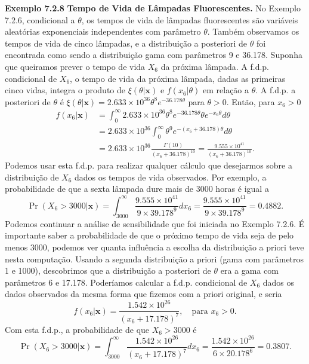 \vspace{1cm}
\noindent\textbf{Exemplo 7.2.8} \quad \textbf{Tempo de Vida de Lâmpadas Fluorescentes.} No Exemplo 7.2.6, condicional a $\theta$, os tempos de vida de lâmpadas fluorescentes são variáveis aleatórias exponenciais independentes com parâmetro $\theta$. Também observamos os tempos de vida de cinco lâmpadas, e a distribuição a posteriori de $\theta$ foi encontrada como sendo a distribuição gama com parâmetros 9 e 36.178. Suponha que queiramos prever o tempo de vida $X_6$ da próxima lâmpada.
A f.d.p. condicional de $X_6$, o tempo de vida da próxima lâmpada, dadas as primeiras cinco vidas, integra o produto de $\xi(\theta|\mathbf{x})$ e $f(x_6|\theta)$ em relação a $\theta$. A f.d.p. a posteriori de $\theta$ é $\xi(\theta|\mathbf{x}) = 2.633 \times 10^{36} \theta^8 e^{-36.178\theta}$ para $\theta > 0$. Então, para $x_6 > 0$
\begin{align}
f(x_6|\mathbf{x}) &= \int_0^{\infty} 2.633 \times 10^{36} \theta^8 e^{-36.178\theta} \theta e^{-x_6\theta} d\theta \nonumber \\
&= 2.633 \times 10^{36} \int_0^{\infty} \theta^9 e^{-(x_6+36.178)\theta} d\theta \tag{7.2.18} \\
&= 2.633 \times 10^{36} \frac{\Gamma(10)}{(x_6+36.178)^{10}} = \frac{9.555 \times 10^{41}}{(x_6+36.178)^{10}}. \nonumber
\end{align}
Podemos usar esta f.d.p. para realizar qualquer cálculo que desejarmos sobre a distribuição de $X_6$ dados os tempos de vida observados. Por exemplo, a probabilidade de que a sexta lâmpada dure mais de 3000 horas é igual a
$$ \Pr(X_6>3000|\mathbf{x}) = \int_{3000}^{\infty} \frac{9.555 \times 10^{41}}{9 \times 39.178^9} dx_6 = \frac{9.555 \times 10^{41}}{9 \times 39.178^9} = 0.4882. $$
Podemos continuar a análise de sensibilidade que foi iniciada no Exemplo 7.2.6. É importante saber a probabilidade de que o próximo tempo de vida seja de pelo menos 3000, podemos ver quanta influência a escolha da distribuição a priori teve nesta computação. Usando a segunda distribuição a priori (gama com parâmetros 1 e 1000), descobrimos que a distribuição a posteriori de $\theta$ era a gama com parâmetros 6 e 17.178. Poderíamos calcular a f.d.p. condicional de $X_6$ dados os dados observados da mesma forma que fizemos com a priori original, e seria
\begin{equation}
f(x_6|\mathbf{x}) = \frac{1.542 \times 10^{26}}{(x_6+17.178)^7}, \quad \text{para } x_6 > 0. \tag{7.2.19}
\end{equation}
Com esta f.d.p., a probabilidade de que $X_6 > 3000$ é
$$ \Pr(X_6>3000|\mathbf{x}) = \int_{3000}^{\infty} \frac{1.542 \times 10^{26}}{(x_6+17.178)^7} dx_6 = \frac{1.542 \times 10^{26}}{6 \times 20.178^6} = 0.3807. $$

